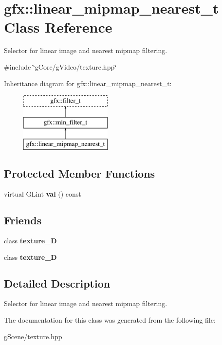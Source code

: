 \hypertarget{classgfx_1_1linear__mipmap__nearest__t}{\section{gfx\-:\-:linear\-\_\-mipmap\-\_\-nearest\-\_\-t Class Reference}
\label{classgfx_1_1linear__mipmap__nearest__t}
}


Selector for linear image and nearest mipmap filtering.  




{\ttfamily \#include \char`\"{}g\-Core/g\-Video/texture.\-hpp\char`\"{}}

Inheritance diagram for gfx\-:\-:linear\-\_\-mipmap\-\_\-nearest\-\_\-t\-:\begin{figure}[H]
\begin{center}
\leavevmode
\includegraphics[height=3.000000cm]{classgfx_1_1linear__mipmap__nearest__t}
\end{center}
\end{figure}
\subsection*{Protected Member Functions}
\begin{DoxyCompactItemize}
\item 
\hypertarget{classgfx_1_1linear__mipmap__nearest__t_afce5d8133a2414670f021885d0c809e8}{virtual G\-Lint {\bfseries val} () const }\label{classgfx_1_1linear__mipmap__nearest__t_afce5d8133a2414670f021885d0c809e8}

\end{DoxyCompactItemize}
\subsection*{Friends}
\begin{DoxyCompactItemize}
\item 
\hypertarget{classgfx_1_1linear__mipmap__nearest__t_a2039d67f6166ccf823c78e3476aad9aa}{class {\bfseries texture\-\_\-D}}\label{classgfx_1_1linear__mipmap__nearest__t_a2039d67f6166ccf823c78e3476aad9aa}

\item 
\hypertarget{classgfx_1_1linear__mipmap__nearest__t_a22ad86ef46c3b17357a0cd59e50bc7dd}{class {\bfseries texture\-\_\-D}}\label{classgfx_1_1linear__mipmap__nearest__t_a22ad86ef46c3b17357a0cd59e50bc7dd}

\end{DoxyCompactItemize}


\subsection{Detailed Description}
Selector for linear image and nearest mipmap filtering. 

The documentation for this class was generated from the following file\-:\begin{DoxyCompactItemize}
\item 
g\-Scene/texture.\-hpp\end{DoxyCompactItemize}
